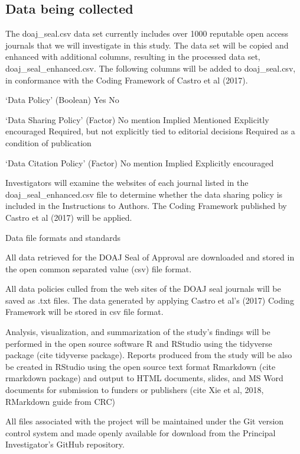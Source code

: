 \documentclass[]{article}
\begin{document}
\subsection{Data being collected}\label{data-being-collected}

The doaj\_seal.csv data set currently includes over 1000 reputable open
access journals that we will investigate in this study. The data set
will be copied and enhanced with additional columns, resulting in the
processed data set, doaj\_seal\_enhanced.csv. The following columns will
be added to doaj\_seal.csv, in conformance with the Coding Framework of
Castro et al (2017).

`Data Policy' (Boolean) Yes No

`Data Sharing Policy' (Factor) No mention Implied Mentioned Explicitly
encouraged Required, but not explicitly tied to editorial decisions
Required as a condition of publication

`Data Citation Policy' (Factor) No mention Implied Explicitly encouraged

Investigators will examine the websites of each journal listed in the
doaj\_seal\_enhanced.csv file to determine whether the data sharing
policy is included in the Instructions to Authors. The Coding Framework
published by Castro et al (2017) will be applied.

Data file formats and standards

All data retrieved for the DOAJ Seal of Approval are downloaded and
stored in the open common separated value (csv) file format.

All data policies culled from the web sites of the DOAJ seal journals
will be saved as .txt files. The data generated by applying Castro et
al's (2017) Coding Framework will be stored in csv file format.

Analysis, visualization, and summarization of the study's findings will
be performed in the open source software R and RStudio using the
tidyverse package (cite tidyverse package). Reports produced from the
study will be also be created in RStudio using the open source text
format Rmarkdown (cite rmarkdown package) and output to HTML documents,
slides, and MS Word documents for submission to funders or publishers
(cite Xie et al, 2018, RMarkdown guide from CRC)

All files associated with the project will be maintained under the Git
version control system and made openly available for download from the
Principal Investigator's GitHub repository.
\end{document}
